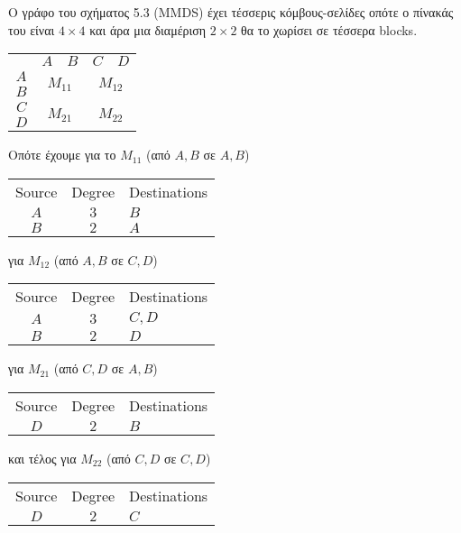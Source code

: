 \documentclass[a4paper,11pt]{article}
\begin{document}
Ο γράφο του σχήματος 5.3 (MMDS) έχει τέσσερις κόμβους-σελίδες οπότε ο πίνακάς του είναι $4 \times 4$ και άρα μια διαμέριση $2 \times 2$ θα το χωρίσει σε τέσσερα blocks.
\begin{center}
	\begin{tabular}{| c | c | c |}
		\hline
		& $A \quad B$ & $C \quad D$ \\ \hhline{|=|=|=|}
		$A$ & \multirow{2}{*}{$M_{11}$} & \multirow{2}{*}{$M_{12}$} \\
		$B$ & & \\
		\hline
		$C$ & \multirow{2}{*}{$M_{21}$} & \multirow{2}{*}{$M_{22}$} \\
		$D$ & & \\
		\hline
	\end{tabular}
\end{center}
Οπότε έχουμε για το $M_{11}$ (από $A,B$ σε $A,B$)
\begin{center}
	\begin{tabular}{| c | c | l |}
		\hline
		Source & Degree & Destinations \\ \hhline{|=|=|=|}
		$A$ & $3$ & $B$ \\
		$B$ & $2$ & $A$ \\
		\hline
	\end{tabular}
\end{center}
για $M_{12}$ (από $A,B$ σε $C,D$)
\begin{center}
	\begin{tabular}{| c | c | l |}
		\hline
		Source & Degree & Destinations \\ \hhline{|=|=|=|}
		$A$ & $3$ & $C,D$ \\
		$B$ & $2$ & $D$ \\
		\hline
	\end{tabular}
\end{center}
για $M_{21}$ (από $C,D$ σε $A,B$)
\begin{center}
	\begin{tabular}{| c | c | l |}
		\hline
		Source & Degree & Destinations \\ \hhline{|=|=|=|}
		$D$ & $2$ & $B$ \\
		\hline
	\end{tabular}
\end{center}
και τέλος για $M_{22}$ (από $C,D$ σε $C,D$)
\begin{center}
	\begin{tabular}{| c | c | l |}
		\hline
		Source & Degree & Destinations \\ \hhline{|=|=|=|}
		$D$ & $2$ & $C$ \\
		\hline
	\end{tabular}
\end{center}
\end{document}
